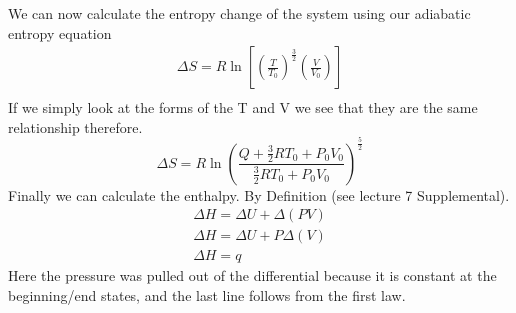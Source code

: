\documentclass{article}
\begin{document}
We can now calculate the entropy change of the system using our adiabatic entropy equation
\begin{equation}
\begin{split}
        \Delta S = R\ln\left[ \left(\frac{T}{T_0}\right)^{\frac{3}{2}}\left(\frac{V}{V_0}\right) \right] \\
        \end{split}
\end{equation}
If we simply look at the forms of the T and V we see that they are the same relationship therefore. 
\begin{equation}
    \Delta S = R\ln\left( \frac{Q+\frac{3}{2}RT_0+P_0V_0}{\frac{3}{2}RT_0+P_0V_0} \right)^{\frac{5}{2}}
\end{equation}
Finally we can calculate the enthalpy. 
By Definition (see lecture 7 Supplemental).
\begin{equation}
\begin{split}
    \Delta H = \Delta U + \Delta(PV) \\
    \Delta H = \Delta U + P\Delta(V)\\
    \Delta H = q
    \end{split}
\end{equation}
Here the pressure was pulled out of the differential because it is constant at the beginning/end states, and the last line follows from the first law. 
\end{document}
